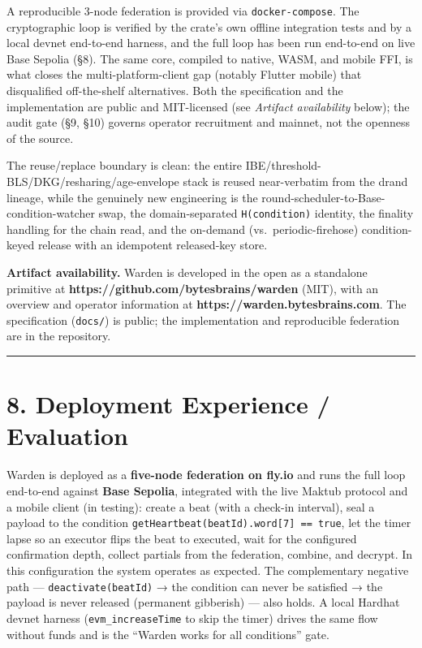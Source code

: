 \documentclass[
  11pt,
]{article}
\begin{document}
A reproducible 3-node federation is provided via
\texttt{docker-compose}. The cryptographic loop is verified by the
crate's own offline integration tests and by a local devnet end-to-end
harness, and the full loop has been run end-to-end on live Base Sepolia (§8).
The same core, compiled to native, WASM, and mobile FFI, is what closes
the multi-platform-client gap (notably Flutter mobile) that disqualified
off-the-shelf alternatives. Both the specification and the
implementation are public and MIT-licensed (see \emph{Artifact
availability} below); the audit gate (§9, §10) governs operator
recruitment and mainnet, not the openness of the source.

The reuse/replace boundary is clean: the entire
IBE/threshold-BLS/DKG/resharing/age-envelope stack is reused
near-verbatim from the drand lineage, while the genuinely new
engineering is the round-scheduler-to-Base-condition-watcher swap, the
domain-separated \texttt{H(condition)} identity, the finality handling
for the chain read, and the on-demand (vs.~periodic-firehose)
condition-keyed release with an idempotent released-key store.

\textbf{Artifact availability.} Warden is developed in the open as a
standalone primitive at \textbf{https://github.com/bytesbrains/warden}
(MIT), with an overview and operator information at
\textbf{https://warden.bytesbrains.com}. The specification
(\texttt{docs/}) is public; the implementation and reproducible
federation are in the repository.

\begin{center}\rule{0.5\linewidth}{0.5pt}\end{center}

\section{8. Deployment Experience /
Evaluation}\label{deployment-experience-evaluation}

Warden is deployed as a \textbf{five-node federation on fly.io} and runs
the full loop end-to-end against \textbf{Base Sepolia}, integrated with
the live Maktub protocol and a mobile client (in testing): create a beat
(with a check-in interval), seal a payload to the condition
\texttt{getHeartbeat(beatId).word{[}7{]}\ ==\ true}, let the timer lapse
so an executor flips the beat to executed, wait for the configured
confirmation depth, collect partials from the federation, combine, and
decrypt. In this configuration the system operates as expected. The
complementary negative path --- \texttt{deactivate(beatId)} → the
condition can never be satisfied → the payload is never released
(permanent gibberish) --- also holds. A local Hardhat devnet harness
(\texttt{evm\_increaseTime} to skip the timer) drives the same flow
without funds and is the ``Warden works for all conditions'' gate.
\end{document}
